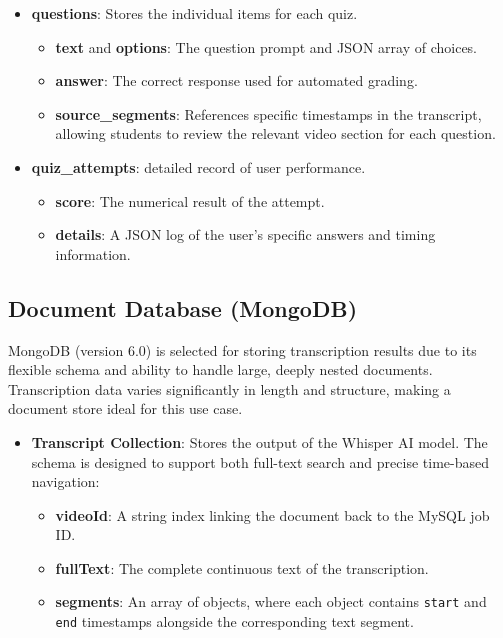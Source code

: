\begin{itemize}
    \item \textbf{questions}: Stores the individual items for each quiz.
    \begin{itemize}
        \item \textbf{text} and \textbf{options}: The question prompt and JSON array of choices.
        \item \textbf{answer}: The correct response used for automated grading.
        \item \textbf{source\_segments}: References specific timestamps in the transcript, allowing students to review the relevant video section for each question.
    \end{itemize}

    \item \textbf{quiz\_attempts}: detailed record of user performance.
    \begin{itemize}
        \item \textbf{score}: The numerical result of the attempt.
        \item \textbf{details}: A JSON log of the user's specific answers and timing information.
    \end{itemize}
\end{itemize}

\subsection{Document Database (MongoDB)}

MongoDB (version 6.0) is selected for storing transcription results due to its flexible schema and ability to handle large, deeply nested documents. Transcription data varies significantly in length and structure, making a document store ideal for this use case.

\begin{itemize}
    \item \textbf{Transcript Collection}: Stores the output of the Whisper AI model. The schema is designed to support both full-text search and precise time-based navigation:
    \begin{itemize}
        \item \textbf{videoId}: A string index linking the document back to the MySQL job ID.
        \item \textbf{fullText}: The complete continuous text of the transcription.
        \item \textbf{segments}: An array of objects, where each object contains \texttt{start} and \texttt{end} timestamps alongside the corresponding text segment.
    \end{itemize}
\end{itemize}

